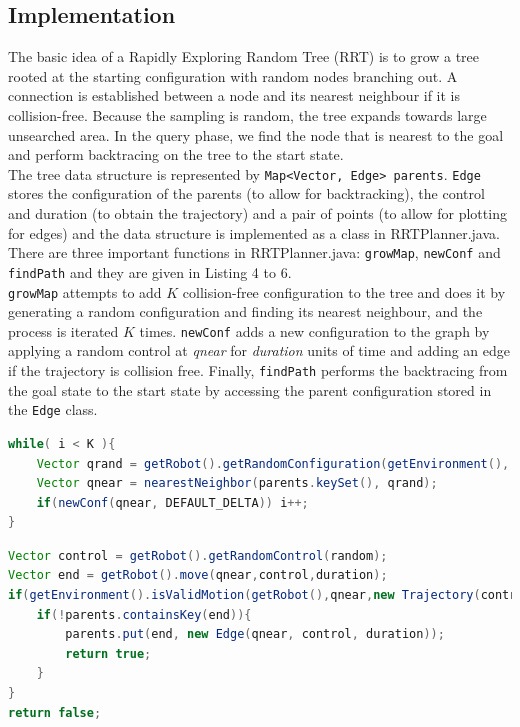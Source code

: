 \documentclass[9.5pt]{extarticle}
\begin{document}
\subsection{Implementation}

The basic idea of a Rapidly Exploring Random Tree (RRT) is to grow a tree rooted at the starting configuration with random nodes branching out. A connection is established between a node and its nearest neighbour if it is collision-free. Because the sampling is random, the tree expands towards large unsearched area. In the query phase, we find the node that is nearest to the goal and perform backtracing on the tree to the start state.\\

The tree data structure is represented by \verb`Map<Vector, Edge> parents`. \verb`Edge` stores the configuration of the parents (to allow for backtracking), the control and duration (to obtain the trajectory) and a pair of points (to allow for plotting for edges) and the data structure is implemented as a class in RRTPlanner.java.\\

There are three important functions in RRTPlanner.java: \verb`growMap`, \verb`newConf` and \verb`findPath` and they are given in Listing 4 to 6.\\

\verb`growMap` attempts to add $K$ collision-free configuration to the tree and does it by generating a random configuration and finding its nearest neighbour, and the process is iterated $K$ times. \verb`newConf` adds a new configuration to the graph by applying a random control at \textit{qnear} for \textit{duration} units of time and adding an edge if the trajectory is collision free. Finally, \verb`findPath` performs the backtracing from the goal state to the start state by accessing the parent configuration stored in the \verb`Edge` class.\\

\begin{lstlisting}[language=java,caption={Java code for growMap}]
while( i < K ){
	Vector qrand = getRobot().getRandomConfiguration(getEnvironment(), random);
	Vector qnear = nearestNeighbor(parents.keySet(), qrand);
	if(newConf(qnear, DEFAULT_DELTA)) i++;
}
\end{lstlisting}

\begin{lstlisting}[language=java,caption={Java code for newConf}]
Vector control = getRobot().getRandomControl(random);
Vector end = getRobot().move(qnear,control,duration);
if(getEnvironment().isValidMotion(getRobot(),qnear,new Trajectory(control,duration),RESOLUTION)) {
	if(!parents.containsKey(end)){
		parents.put(end, new Edge(qnear, control, duration));
		return true;
	}
}
return false;
\end{lstlisting}
\end{document}

